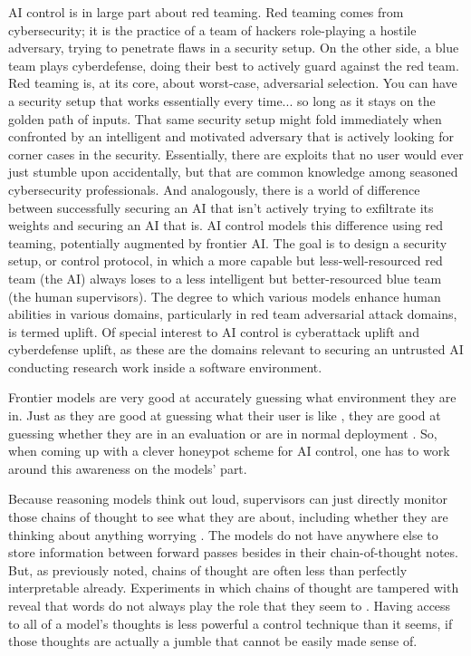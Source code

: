AI control is in large part about red teaming. Red teaming comes from
cybersecurity; it is the practice of a team of hackers role-playing a hostile
adversary, trying to penetrate flaws in a security setup. On the other side, a
blue team plays cyberdefense, doing their best to actively guard against the
red team. Red teaming is, at its core, about worst-case, adversarial selection.
You can have a security setup that works essentially every time... so long as
it stays on the golden path of inputs. That same security setup might fold
immediately when confronted by an intelligent and motivated adversary that is
actively looking for corner cases in the security. Essentially, there are
exploits that no user would ever just stumble upon accidentally, but that are
common knowledge among seasoned cybersecurity professionals. And analogously,
there is a world of difference between successfully securing an AI that isn't
actively trying to exfiltrate its weights and securing an AI that is. AI
control models this difference using red teaming, potentially augmented by
frontier AI. The goal is to design a security setup, or control protocol, in
which a more capable but less-well-resourced red team (the AI) always loses to
a less intelligent but better-resourced blue team (the human supervisors). The
degree to which various models enhance human abilities in various domains,
particularly in red team adversarial attack domains, is termed uplift. Of
special interest to AI control is cyberattack uplift and cyberdefense uplift,
as these are the domains relevant to securing an untrusted AI conducting
research work inside a software environment.

Frontier models are very good at accurately guessing what environment they are
in. Just as they are good at guessing what their user is like
\cite{derner2024truesight}, they are good at guessing whether they are in an
evaluation or are in normal deployment \cite{needham2025know}. So, when coming
up with a clever honeypot scheme for AI control, one has to work around this
awareness on the models' part.

Because reasoning models think out loud, supervisors can just directly monitor
those chains of thought to see what they are about, including whether they are
thinking about anything worrying \cite{baker2025monitoring}. The models do not
have anywhere else to store information between forward passes besides in their
chain-of-thought notes. But, as previously noted, chains of thought are often
less than perfectly interpretable already. Experiments in which chains of
thought are tampered with reveal that words do not always play the role that
they seem to \cite{}. Having access to all of a model's thoughts is less
powerful a control technique than it seems, if those thoughts are actually a
jumble that cannot be easily made sense of.

